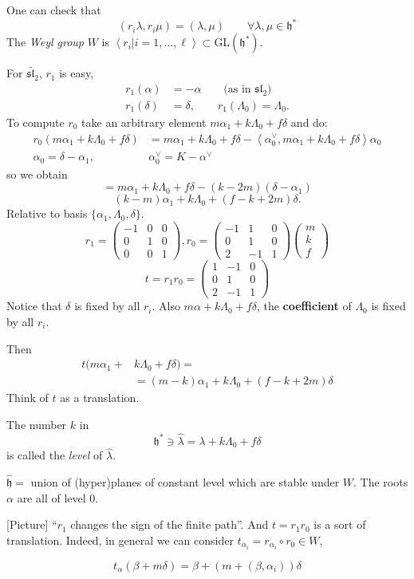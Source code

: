 One can check that
$$
(r_i\lambda,r_i\mu)=(\lambda,\mu)\qquad \forall \lambda,\mu \in \mathfrak{h}^*
$$
The {\it Weyl group} $W$ is $\left<r_i|i=1,\ldots,\ell\right>\subset 
\text{GL}(\mathfrak{h}^*)$.

\begin{example}
\label{example-Weyl-group-sl2tilde}
For $\widetilde{\mathfrak{sl}_2}$, $r_1$ is easy,
\begin{align*}
r_1(\alpha)&=-\alpha \qquad \text{(as in $\mathfrak{sl}_2$)}\\
r_1(\delta)&=\delta,\qquad r_1(\Lambda_0)=\Lambda_0.
\end{align*}
To compute $r_0$ take an arbitrary element $m \alpha_1+k\Lambda_0+f\delta$ and
do:
\begin{align*}
r_0(m \alpha_1+k\Lambda_0+f\delta)&=m\alpha_1+k\Lambda_0+f\delta
-\left<\alpha_0^\vee,m\alpha_1+k\Lambda_0+f\delta\right>\alpha_0\\
\alpha_0=\delta-\alpha_1,\qquad & \alpha_0^\vee=K-\alpha^\vee
\end{align*}
so we obtain
$$
=m\alpha_1+k\Lambda_0+f\delta-(k-2m)(\delta-\alpha_1)
$$
$$
(k-m)\alpha_1+k\Lambda_0+(f-k+2m)\delta.
$$
Relative to basis $\{\alpha_1,\Lambda_0,\delta\}$.
$$
r_1=\begin{pmatrix}
-1&0&0\\
0&1&0\\
0&0&1
\end{pmatrix},
r_0=\begin{pmatrix}
-1&1&0\\
0&1&0\\
2&-1&1
\end{pmatrix}
\begin{pmatrix}
m\\
k\\
f
\end{pmatrix}
$$
$$
t=r_1r_0=\begin{pmatrix}
1&-1&0\\
0&1&0\\
2&-1&1
\end{pmatrix}
$$
Notice that $\delta$ is fixed by all $r_i$. Also 
$m \alpha+k \Lambda_0 +f\delta$, the {\bf coefficient} of $\Lambda_0$ is fixed
by all $r_i$.

Then
\begin{align*}
t(m\alpha_1+&k\Lambda_0+f\delta)=\\
&=(m-k)\alpha_1+k\Lambda_0+(f-k+2m)\delta
\end{align*}
Think of $t$ as a translation.

The number $k$ in 
 $$
\mathfrak{h}^* \ni \hat{\lambda}=\lambda+k\Lambda_0+f\delta
$$
is called the {\it level} of $\hat{\lambda}$.

$\hat{\mathfrak{h}}=$ union of (hyper)planes of constant level which are stable
under $W$. The roots $\alpha$ are all of level $0$.

[Picture] 
``$r_1$ changes the sign of the finite path''. And $t=r_1r_0$ is a sort of
translation. Indeed, in general we can consider 
$t_{\alpha_i}=r_{\alpha_i}\circ r_0 \in W$,

$$
t_\alpha(\beta+m\delta)=\beta+(m+(\beta,\alpha_i))\delta
$$
\end{example}
